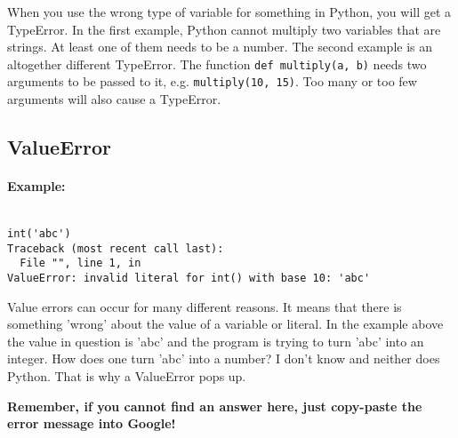 When you use the wrong type of variable for something in Python, you will get a TypeError. In the first example, Python                 cannot multiply two variables that are strings. At least one of them needs to be a number. The second example is an altogether                 different TypeError. The function 
\texttt{def multiply(a, b)} needs two arguments to be passed to it, e.g. 
\texttt{multiply(10, 15)}.                 Too many or too few arguments will also cause a TypeError.

\subsection{ValueError}

\paragraph{Example:}
\begin{lstlisting}

int('abc')
Traceback (most recent call last):
  File "", line 1, in 
ValueError: invalid literal for int() with base 10: 'abc'\end{lstlisting}

Value errors can occur for many different reasons. It means that there is something 'wrong' about the value of a variable or                  literal. In the example above the value in question is 'abc' and the program is trying to turn 'abc' into an integer. How does one                 turn 'abc' into a number? I don't know and neither does Python. That is why a ValueError pops up.

\textbf{Remember, if you cannot find an answer here, just copy-paste the error message into Google!} 

